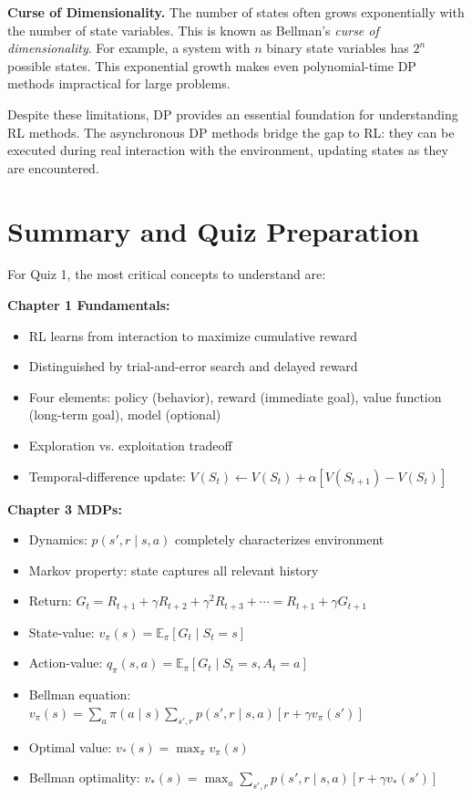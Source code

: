 \documentclass[12pt]{article}
\begin{document}
\textbf{Curse of Dimensionality.} The number of states often grows exponentially with the number of state variables. This is known as Bellman's \textit{curse of dimensionality}. For example, a system with $n$ binary state variables has $2^n$ possible states. This exponential growth makes even polynomial-time DP methods impractical for large problems.

Despite these limitations, DP provides an essential foundation for understanding RL methods. The asynchronous DP methods bridge the gap to RL: they can be executed during real interaction with the environment, updating states as they are encountered.

\section{Summary and Quiz Preparation}

For Quiz 1, the most critical concepts to understand are:

\textbf{Chapter 1 Fundamentals:}
\begin{itemize}
\item RL learns from interaction to maximize cumulative reward
\item Distinguished by trial-and-error search and delayed reward
\item Four elements: policy (behavior), reward (immediate goal), value function (long-term goal), model (optional)
\item Exploration vs. exploitation tradeoff
\item Temporal-difference update: $V(S_t) \leftarrow V(S_t) + \alpha[V(S_{t+1}) - V(S_t)]$
\end{itemize}

\textbf{Chapter 3 MDPs:}
\begin{itemize}
\item Dynamics: $p(s', r \mid s, a)$ completely characterizes environment
\item Markov property: state captures all relevant history
\item Return: $G_t = R_{t+1} + \gamma R_{t+2} + \gamma^2 R_{t+3} + \cdots = R_{t+1} + \gamma G_{t+1}$
\item State-value: $v_\pi(s) = \mathbb{E}_\pi[G_t \mid S_t = s]$
\item Action-value: $q_\pi(s, a) = \mathbb{E}_\pi[G_t \mid S_t = s, A_t = a]$
\item Bellman equation: $v_\pi(s) = \sum_a \pi(a \mid s) \sum_{s', r} p(s', r \mid s, a)[r + \gamma v_\pi(s')]$
\item Optimal value: $v_*(s) = \max_\pi v_\pi(s)$
\item Bellman optimality: $v_*(s) = \max_a \sum_{s', r} p(s', r \mid s, a)[r + \gamma v_*(s')]$
\end{itemize}
\end{document}
